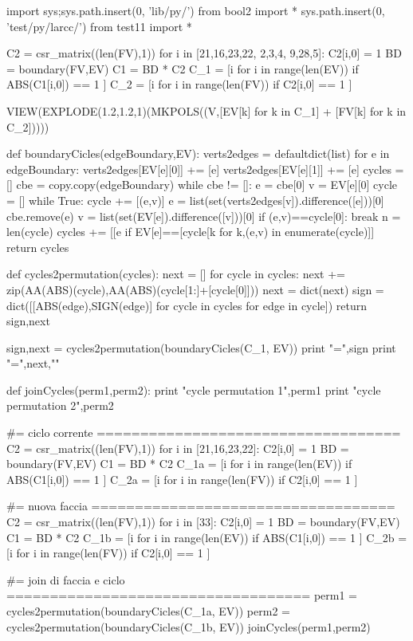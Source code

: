import sys;sys.path.insert(0, 'lib/py/')
from bool2 import *
sys.path.insert(0, 'test/py/larcc/')
from test11 import *

C2 = csr_matrix((len(FV),1))
for i in [21,16,23,22, 2,3,4, 9,28,5]: C2[i,0] = 1
BD = boundary(FV,EV)
C1 = BD * C2
C_1 = [i for i in range(len(EV)) if ABS(C1[i,0]) == 1 ]
C_2 = [i for i in range(len(FV)) if C2[i,0] == 1 ]

VIEW(EXPLODE(1.2,1.2,1)(MKPOLS((V,[EV[k] for k in C_1] + [FV[k] for k in C_2]))))

def boundaryCicles(edgeBoundary,EV):
    verts2edges = defaultdict(list)
    for e in edgeBoundary:
        verts2edges[EV[e][0]] += [e]
        verts2edges[EV[e][1]] += [e]
    cycles = []
    cbe = copy.copy(edgeBoundary)
    while cbe != []:
        e = cbe[0]
        v = EV[e][0]
        cycle = []
        while True:
            cycle += [(e,v)]
            e = list(set(verts2edges[v]).difference([e]))[0]
            cbe.remove(e)
            v = list(set(EV[e]).difference([v]))[0]
            if (e,v)==cycle[0]:
                break
        n = len(cycle)
        cycles += [[e if EV[e]==[cycle[k%
            for k,(e,v) in enumerate(cycle)]]
    return cycles
    
def cycles2permutation(cycles):
    next = []
    for cycle in cycles:
        next += zip(AA(ABS)(cycle),AA(ABS)(cycle[1:]+[cycle[0]]))
    next = dict(next)
    sign = dict([[ABS(edge),SIGN(edge)] for cycle in cycles for edge in cycle])
    return sign,next

sign,next = cycles2permutation(boundaryCicles(C_1, EV))
print "\nsign =",sign
print "\nnext =",next,"\n"


def joinCycles(perm1,perm2):
	print "cycle permutation 1",perm1
	print "cycle permutation 2",perm2


#= ciclo corrente ===================================
C2 = csr_matrix((len(FV),1))
for i in [21,16,23,22]: C2[i,0] = 1
BD = boundary(FV,EV)
C1 = BD * C2
C_1a = [i for i in range(len(EV)) if ABS(C1[i,0]) == 1 ]
C_2a = [i for i in range(len(FV)) if C2[i,0] == 1 ]

#= nuova faccia ===================================
C2 = csr_matrix((len(FV),1))
for i in [33]: C2[i,0] = 1
BD = boundary(FV,EV)
C1 = BD * C2
C_1b = [i for i in range(len(EV)) if ABS(C1[i,0]) == 1 ]
C_2b = [i for i in range(len(FV)) if C2[i,0] == 1 ]
  
#= join di faccia e ciclo ===================================
perm1 = cycles2permutation(boundaryCicles(C_1a, EV))
perm2 = cycles2permutation(boundaryCicles(C_1b, EV))
joinCycles(perm1,perm2)

